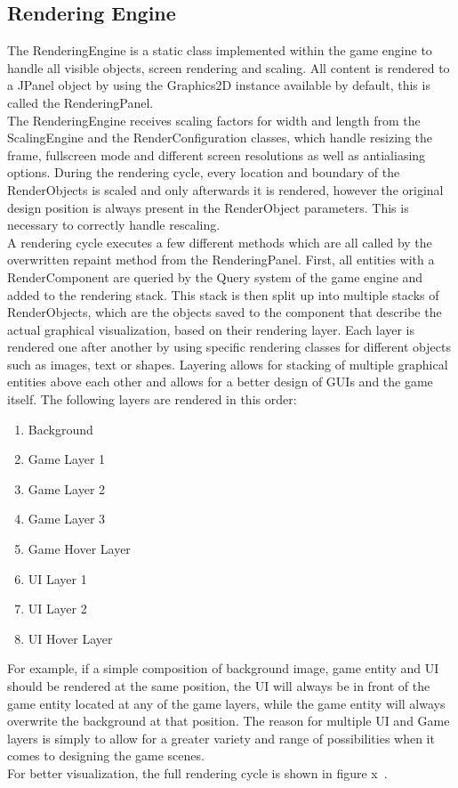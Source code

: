 \subsection{Rendering Engine}\label{subsec:graphics-engine}
The RenderingEngine is a static class implemented within the game engine to handle all visible objects, screen rendering and scaling.
All content is rendered to a JPanel object by using the Graphics2D instance available by default, this is called the RenderingPanel.
\\
The RenderingEngine receives scaling factors for width and length from the ScalingEngine and the RenderConfiguration classes, which handle resizing the frame,
fullscreen mode and different screen resolutions as well as antialiasing options.
During the rendering cycle, every location and boundary of the RenderObjects is scaled and only afterwards it is rendered, however the original design position
is always present in the RenderObject parameters.
This is necessary to correctly handle rescaling.
\\
A rendering cycle executes a few different methods which are all called by the overwritten repaint method from the RenderingPanel.
First, all entities with a RenderComponent are queried by the Query system of the game engine and added to the rendering stack.
This stack is then split up into multiple stacks of RenderObjects, which are the objects saved to the component that describe the actual graphical visualization, based
on their rendering layer.
Each layer is rendered one after another by using specific rendering classes for different objects such as images, text or shapes.
Layering allows for stacking of multiple graphical entities above each other and allows for a better design of GUIs and the game itself.
The following layers are rendered in this order:
\begin{enumerate}
    \item Background
    \item Game Layer 1
    \item Game Layer 2
    \item Game Layer 3
    \item Game Hover Layer
    \item UI Layer 1
    \item UI Layer 2
    \item UI Hover Layer
\end{enumerate}
For example, if a simple composition of background image, game entity and UI should be rendered at the same position, the UI will always be in front of the game entity located at any of the game layers,
while the game entity will always overwrite the background at that position.
The reason for multiple UI and Game layers is simply to allow for a greater variety and range of possibilities when it comes to designing the game scenes.
\\
For better visualization, the full rendering cycle is shown in figure x~.

